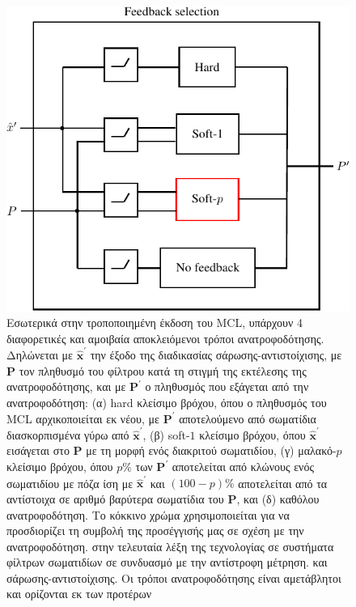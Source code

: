 \begin{figure}[ht]\centering
  \includegraphics[scale=0.9]{./figures/parts/02/chapters/02/sections/03/feedback}
  \caption{\small Εσωτερικά στην τροποποιημένη έκδοση του MCL, υπάρχουν 4 διαφορετικές
           και αμοιβαία αποκλειόμενοι τρόποι ανατροφοδότησης. Δηλώνεται με
           $\hat{\bm{x}}^{\prime}$ την έξοδο της διαδικασίας σάρωσης-αντιστοίχισης, με
           $\bm{P}$ τον πληθυσμό του φίλτρου κατά τη στιγμή της εκτέλεσης της ανατροφοδότησης,
           και με $\bm{P}^{\prime}$ ο πληθυσμός που εξάγεται από την ανατροφοδότηση: (α) hard
           κλείσιμο βρόχου, όπου ο πληθυσμός του MCL αρχικοποιείται εκ νέου, με
           $\bm{P}^{\prime}$ αποτελούμενο από σωματίδια διασκορπισμένα γύρω από
           $\hat{\bm{x}}^{\prime}$, (β) soft-$1$ κλείσιμο βρόχου, όπου
           $\hat{\bm{x}}^{\prime}$ εισάγεται στο $\bm{P}$ με τη μορφή
           ενός διακριτού σωματιδίου, (γ) μαλακό-$p$ κλείσιμο βρόχου, όπου $p\%$ των
           $\bm{P}^{\prime}$ αποτελείται από κλώνους ενός σωματιδίου
           με πόζα ίση με $\hat{\bm{x}}^{\prime}$ και $(100-p)\%$
           αποτελείται από τα αντίστοιχα σε αριθμό βαρύτερα σωματίδια του
           $\bm{P}$, και (δ) καθόλου ανατροφοδότηση. Το κόκκινο χρώμα χρησιμοποιείται για να
           προσδιορίζει τη συμβολή της προσέγγισής μας σε σχέση με την ανατροφοδότηση.
           στην τελευταία λέξη της τεχνολογίας σε συστήματα φίλτρων σωματιδίων σε συνδυασμό με την αντίστροφη μέτρηση.
           και σάρωσης-αντιστοίχισης. Οι τρόποι ανατροφοδότησης είναι αμετάβλητοι και ορίζονται εκ των προτέρων}
  \label{fig:feedback}
\end{figure}

